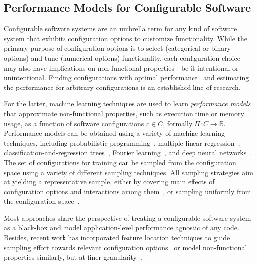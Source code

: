 \subsection{Performance Models for Configurable Software}
Configurable software systems are an umbrella term for any kind of software system that exhibits configuration options to customize functionality. 
While the primary purpose of configuration options is to select (categorical or binary options) and tune (numerical options) functionality, each configuration choice may also have implications on non-functional properties---be it intentional or unintentional. Finding configurations with optimal performance~\cite{nairUsingBadLearners2017,nairFlash18,ohFindingNearoptimalConfigurations2017} and estimating the performance for arbitrary configurations is an established line of research\cite{siegmundPerformanceinfluenceModelsHighly2015,haDeepPerf2019,perfAL,guoVariabilityawarePerformancePrediction2013,sarkarCostEfficientSamplingPerformance,guo_2018_data,fourier_learning_2015,perLasso}. 

For the latter, machine learning techniques are used to learn \emph{performance models} that approximate non-functional properties, such as execution time or memory usage, as a function of software configurations $c \in C$, formally $\Pi: C \rightarrow \mathbb{R}$.
Performance models can be obtained using a variety of machine learning techniques, including probabilistic programming~\cite{dorn2020}, multiple linear regression~\cite{siegmundPerformanceinfluenceModelsHighly2015}, classification-and-regression trees~\cite{sarkarCostEfficientSamplingPerformance,guo_2018_data}, Fourier learning~\cite{fourier_learning_2015,perLasso}, and deep neural networks~\cite{haDeepPerf2019,perfAL}.
The set of configurations for training can be sampled from the configuration space using a variety of different sampling techniques. All sampling strategies aim at yielding a representative sample, either by covering main effects of configuration options and interactions among them~\cite{siegmundPredictingPerformanceAutomated2012}, or sampling uniformly from the configuration space~\cite{ohFindingNearoptimalConfigurations2017,kaltenecker_distance-based_2019}.

Most approaches share the perspective of treating a configurable software system as a black-box and model application-level performance agnostic of any code. Besides, recent work has incorporated feature location techniques to guide sampling effort towards relevant configuration options~\cite{velez_2020_configcrusher_jase,velez_comprex_2021} or model non-functional properties similarly, but at finer granularity~\cite{weber_white_2021}.

